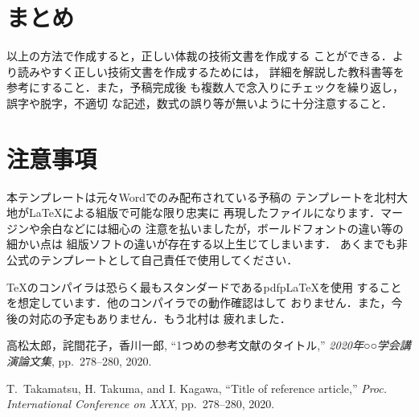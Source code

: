 \documentclass[a4j]{jsarticle}
\begin{document}
\section{まとめ}

以上の方法で作成すると，正しい体裁の技術文書を作成する
ことができる．より読みやすく正しい技術文書を作成するためには，
詳細を解説した教科書等を参考にすること．また，予稿完成後
も複数人で念入りにチェックを繰り返し，誤字や脱字，不適切
な記述，数式の誤り等が無いように十分注意すること．

\section{注意事項}

本テンプレートは元々Wordでのみ配布されている予稿の
テンプレートを北村大地がLaTeXによる組版で可能な限り忠実に
再現したファイルになります．マージンや余白などには細心の
注意を払いましたが，ボールドフォントの違い等の細かい点は
組版ソフトの違いが存在する以上生じてしまいます．
あくまでも非公式のテンプレートとして自己責任で使用してください．

TeXのコンパイラは恐らく最もスタンダードであるpdfpLaTeXを使用
することを想定しています．他のコンパイラでの動作確認はして
おりません．また，今後の対応の予定もありません．もう北村は
疲れました．


\begin{thebibliography}{9}%

  高松太郎，詫間花子，香川一郎,
  ``1つめの参考文献のタイトル,''
  {\it 2020年○○学会講演論文集}, pp.~278--280, 2020.

  T.~Takamatsu, H. Takuma, and I. Kagawa, 
  ``Title of reference article,''
  {\it Proc. International Conference on XXX}, pp.~278--280, 2020.


\end{thebibliography}
\end{document}
